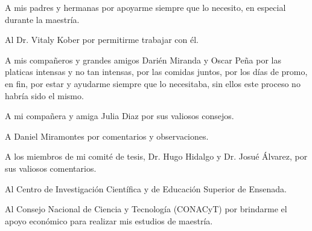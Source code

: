 

A mis padres y hermanas por apoyarme siempre que lo necesito, en especial durante la maestría. 
\bigskip 

Al Dr. Vitaly Kober por permitirme trabajar con él. 
\bigskip

A mis compañeros y grandes amigos Darién Miranda y Oscar Peña por las platicas intensas y no tan intensas, por las comidas juntos, por los días de promo, en fin, por estar y ayudarme siempre que lo necesitaba, sin ellos este proceso no habría sido el mismo.    
\bigskip 

A mi compañera y amiga Julia Diaz por sus valiosos consejos.   
\bigskip

A Daniel Miramontes por comentarios y observaciones.  
\bigskip 

A los miembros de mi comité de tesis, Dr. Hugo Hidalgo y Dr. Josu\'e \'Alvarez, por sus valiosos comentarios.  
\bigskip
 
Al Centro de Investigación Científica y de Educación Superior de Ensenada.
\bigskip

Al Consejo Nacional de Ciencia y Tecnología (CONACyT) por brindarme el apoyo econ\'omico para realizar mis estudios de maestría.
